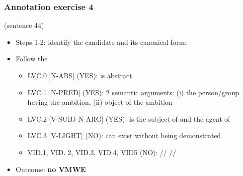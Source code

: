 \documentclass[xcolor=dvipsnames]{beamer}
\begin{document}
\begin{frame} 
\frametitle{Annotation exercise 4}

 (sentence 44)

\pause

\begin{scriptsize}
\begin{block}{}
\begin{itemize}
\item Steps 1-2: identify the candidate and its canonical form:  
\item Follow the \href{http://parsemefr.lif.univ-mrs.fr/parseme-st-guidelines/1.3/?page=040\_Annotation\_process\_-\_decision\_tree}{}
   \begin{itemize}
   \item LVC.0 [N-ABS] (YES):  is abstract
   \item LVC.1 [N-PRED] (YES): 2 semantic arguments: (i) the person/group having the ambition, (ii) object of the ambition
   \item LVC.2 [V-SUBJ-N-ARG] (YES):  is the subject of  and the agent of 
   \item LVC.3 [V-LIGHT] (NO):  can exist without being demonstrated
   \item VID.1, VID. 2, VID.3, VID.4, VID5 (NO): //  //
   \end{itemize}
\item Outcome: \textbf{no VMWE}
\end{itemize}
\end{block}

\end{scriptsize}

\end{frame}
\end{document}

